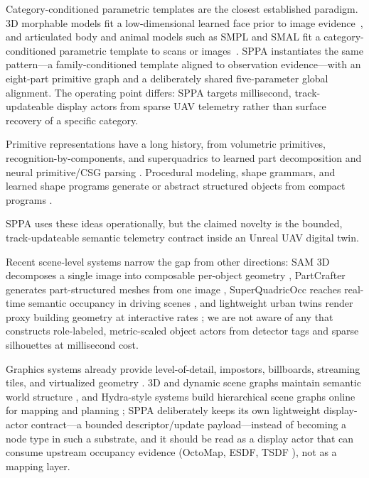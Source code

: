 \documentclass[11pt,a4paper]{article}
\begin{document}
Category-conditioned parametric templates are the closest established paradigm.
3D morphable models fit a low-dimensional learned face prior to image
evidence~\cite{blanz1999morphable}, and articulated body and animal models such
as SMPL and SMAL fit a category-conditioned parametric template to scans or
images~\cite{loper2015smpl,zuffi2017smal}. SPPA instantiates the same
pattern---a family-conditioned template aligned to observation evidence---with
an eight-part primitive graph and a deliberately shared five-parameter global
alignment. The operating point differs: SPPA targets millisecond,
track-updateable display actors from sparse UAV telemetry rather than
surface recovery of a specific category.

{\sloppy
Primitive representations have a long history, from volumetric primitives,
recognition-by-components, and superquadrics to learned part decomposition and
neural primitive/CSG parsing
\cite{biederman1987recognition,solina1990recovery,paschalidou2019superquadrics,tulsiani2017learning,mo2019partnet,sharma2018csgnet,fedele2025superdec}.
Procedural modeling, shape grammars, and learned shape programs generate or
abstract structured objects from compact programs
\cite{mueller2006procedural,jones2020shapeassembly,jones2023shapecoder,khan2024text2cad,rukhovich2024cadrecode}.
\par}
SPPA uses these ideas operationally, but the claimed novelty is the bounded,
track-updateable semantic telemetry contract inside an Unreal UAV digital twin.

Recent scene-level systems narrow the gap from other directions: SAM 3D
decomposes a single image into composable per-object geometry
\cite{chen2026sam3d}, PartCrafter generates part-structured meshes from one
image \cite{lin2025partcrafter}, SuperQuadricOcc reaches real-time semantic
occupancy in driving scenes \cite{hayes2025superquadricocc}, and lightweight
urban twins render proxy building geometry at interactive rates
\cite{liu2025citygo}; we are not aware of any that constructs role-labeled,
metric-scaled object actors from detector tags and sparse silhouettes at
millisecond cost.

Graphics systems already provide level-of-detail, impostors, billboards,
streaming tiles, and virtualized geometry \cite{clark1976hierarchical,decoret2003billboard,epic2026nanite,ogc2023tiles}.
3D and dynamic scene graphs maintain semantic world structure
\cite{armeni2019scenegraph,rosinol2020dynamic,wu2021scenegraphfusion}, and
Hydra-style systems build hierarchical scene graphs online for mapping and
planning \cite{hughes2022hydra}; SPPA deliberately keeps its own lightweight
display-actor contract---a bounded descriptor/update payload---instead of
becoming a node type in such a substrate, and it should be read as a display
actor that can consume upstream occupancy evidence (OctoMap, ESDF, TSDF
\cite{hornung2013octomap,oleynikova2017voxblox}), not as a mapping layer.
\end{document}
